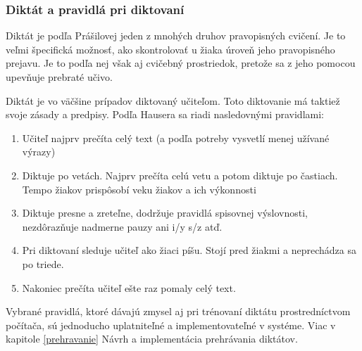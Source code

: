 \documentclass[12pt,oneside]{fithesis2}
\begin{document}
			\subsubsection{Diktát a pravidlá pri diktovaní}
	\par Diktát je podľa Prášilovej\cite{prasilova14} jeden z mnohých druhov pravopisných cvičení. Je to veľmi špecifická možnosť, ako skontrolovať u žiaka úroveň jeho pravopisného prejavu. Je to podľa nej však aj cvičebný prostriedok, pretože sa z jeho pomocou upevňuje prebraté učivo. 
	\par Diktát je vo väčšine prípadov diktovaný učiteľom. Toto diktovanie má taktiež svoje zásady a predpisy. Podľa Hausera\cite{hauser94} sa riadi nasledovnými pravidlami:
	      \begin{enumerate}
	\item Učiteľ najprv prečíta celý text (a podľa potreby vysvetlí menej užívané výrazy)
	\item Diktuje po vetách. Najprv prečíta celú vetu a potom diktuje po častiach. Tempo žiakov prispôsobí veku žiakov a ich výkonnosti
	\item Diktuje presne a zreteľne, dodržuje pravidlá spisovnej výslovnosti, nezdôrazňuje nadmerne pauzy ani i/y s/z atď.
	\item Pri diktovaní sleduje učiteľ ako žiaci píšu. Stojí pred žiakmi a neprechádza sa po triede.
	\item Nakoniec prečíta učiteľ ešte raz pomaly celý text.
\end{enumerate}

\par Vybrané pravidlá, ktoré dávajú zmysel aj pri trénovaní diktátu prostredníctvom počítača, sú jednoducho uplatniteľné a implementovateľné v systéme. Viac v kapitole \ref{prehravanie} Návrh a implementácia prehrávania diktátov.
\end{document}

